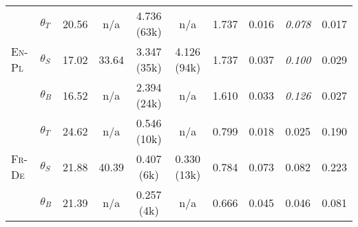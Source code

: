 \begin{minipage}{\textwidth}
\begin{center}
{\begin{tabular}{llcccccccc}
    \multirow{3}{*}{\textsc{En}-\textsc{Pl}}  & $\theta_T$          & 20.56 &  n/a    &  4.736 (63k) &  n/a         & 1.737 & 0.016         & \textit{0.078} & 0.017  \\
                                              & $\theta_{S}$        & 17.02 &  33.64  &  3.347 (35k) &  4.126 (94k) & 1.737 & 0.037         & \textit{0.100} & 0.029  \\
                                              & $\theta_{B}$        & 16.52 &  n/a    &  2.394 (24k) &  n/a         & 1.610 & 0.033         & \textit{0.126} & 0.027  \\\midrule
    \multirow{3}{*}{\textsc{Fr}-\textsc{De}}  & $\theta_T$          & 24.62 &  n/a    &  0.546 (10k) &  n/a         & 0.799 & 0.018         & 0.025          & 0.190  \\
                                              & $\theta_{S}$        & 21.88 &  40.39  &  0.407 (6k)  &  0.330 (13k) & 0.784 & 0.073         & 0.082          & 0.223  \\
                                              & $\theta_{B}$        & 21.39 &  n/a    &  0.257 (4k)  &  n/a         & 0.666 & 0.045         & 0.046          & 0.081  \\
    \bottomrule
    \end{tabular}}\end{center}
    \label{tab:ap:memorization}
\end{minipage}
\vspace{.0cm}

